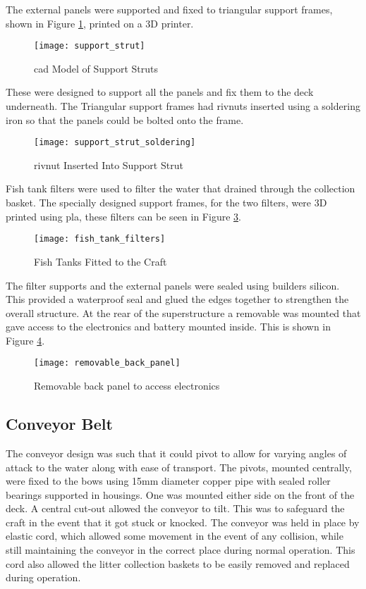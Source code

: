 \documentclass [12pt]{article}
\begin{document}
The external panels were supported and fixed to triangular support frames, shown in Figure \ref{fig:support_strut}, printed on a 3D printer. 

\begin{figure}[H]
\centerline{\texttt{[image: support\_strut]}}
\caption{\gls{cad} Model of Support Struts}
\label{fig:support_strut}
\end{figure}

These were designed to support all the panels and fix them to the deck underneath. The Triangular support frames had \gls{rivnut}s inserted using a soldering iron so that the panels could be bolted onto the frame.

\begin{figure}[H]
\centerline{\texttt{[image: support\_strut\_soldering]}}
\caption{\gls{rivnut} Inserted Into Support Strut}
\label{fig:support_strut_soldering}
\end{figure}

Fish tank filters were used to filter the water that drained through the collection basket. The specially designed support frames, for the two filters, were 3D printed using \gls{pla}, these filters can be seen in Figure \ref{fig:fish_tank_filters}.

\begin{figure}[H]
\centerline{\texttt{[image: fish\_tank\_filters]}}
\caption{Fish Tanks Fitted to the Craft}
\label{fig:fish_tank_filters}
\end{figure}


The filter supports and the external panels were sealed using builders silicon. This provided a waterproof seal and glued the edges together to strengthen the overall structure.
At the rear of the superstructure a removable was mounted that gave access to the electronics and battery mounted inside. This is shown in Figure \ref{fig:removable_back_panel}.

\begin{figure}[H]
\centerline{\texttt{[image: removable\_back\_panel]}}
\caption{Removable back panel to access electronics}
\label{fig:removable_back_panel}
\end{figure}

\subsection{Conveyor Belt}

The conveyor design was such that it could pivot to allow for varying angles of attack to the water along with ease of transport. The pivots, mounted centrally, were fixed to the bows using 15mm diameter copper pipe with sealed roller bearings supported in housings.  One was mounted either side on the front of the deck. A central cut-out allowed the conveyor to tilt. This was to safeguard the craft in the event that it got stuck or knocked. The conveyor was held in place by elastic cord, which allowed some movement in the event of any collision, while still maintaining the conveyor in the correct place during normal operation. This cord also allowed the litter collection baskets to be easily removed and replaced during operation. 
\end{document}
